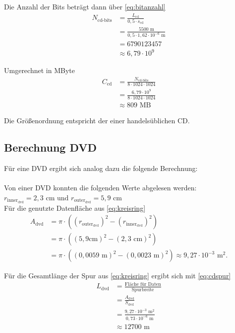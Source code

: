 \documentclass[9pt,twocolumn,twoside]{pnas-new}
\begin{document}
Die Anzahl der Bits beträgt dann über \eqref{eq:bitanzahl}
\begin{align*}
N_{\mbox{cd-bits}} &=  \frac{L_{\mbox{cd}}}{0,5\cdot s_{\mbox{cd}}}\\
&= \frac{5500\mbox{ m}}{0,5 \cdot 1,62 \cdot 10^{-6}\mbox{ m}}\\
&= 6790123457 \\
&\approx 6,79 \cdot 10^9
\end{align*}

Umgerechnet in MByte
\begin{align*}
C_{\mbox{cd}} &= \frac{N_{\mbox{cd-bits}}}{8\cdot1024\cdot1024}\\
&= \frac{ 6,79\cdot10^9}{8\cdot1024\cdot1024}\\
&\approx 809\mbox{ MB}
\end{align*}

Die Größenordnung entspricht der einer handelsüblichen CD.

\subsection{Berechnung DVD}
Für eine DVD ergibt sich analog dazu die folgende Berechnung: \\ \\
Von einer DVD konnten die folgenden Werte abgelesen werden: \begin{math} r_{\mbox{inner}_{\mbox{dvd}}} = 2,3 \mbox{ cm und } r_{\mbox{outer}_{\mbox{dvd}}} = 5,9 \mbox{ cm} \end{math} \\

Für die genutzte Datenfläche aus \eqref{eq:kreisring}
\begin{align*}
 A_{\mbox{dvd}} &= \pi\cdot((r_{\mbox{outer}_{\mbox{dvd}}})^2-(r_{\mbox{inner}_{\mbox{dvd}}})^2)  \\	
&= \pi\cdot((5,9\mbox{cm})^2-(2,3\mbox{ cm})^2) \\
 &=  \pi\cdot((0,0059\mbox{ m})^2-(0,0023\mbox{ m})^2) \approx 9,27\cdot10^{-3}\mbox{ m}^2.
\end{align*}

Für die Gesamtlänge der Spur aus \eqref{eq:kreisring} ergibt sich mit \eqref{eq:cdspur}
\begin{align*}
 L_{\mbox{dvd}} &= \frac{\mbox{Fläche für Daten}}{\mbox{Spurbreite}}\\
 &= \frac{A_{\mbox{dvd}}}{S_{\mbox{dvd}}}\\
 &= \frac{9,27\cdot10^{-3}\mbox{ m}^2}{0,73\cdot10^{-6}\mbox{ m} }\\
 &\approx 12700\mbox{ m}
\end{align*}
\end{document}
